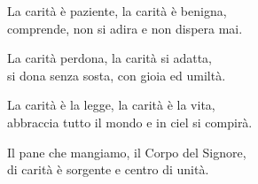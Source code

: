 

\spazio

\strofa La carità è paziente, la carità è benigna,\\
comprende, non si adira e non dispera mai.

\spazio


\spazio

\strofa La carità perdona, la carità si adatta,\\
si dona senza sosta, con gioia ed umiltà.

\spazio


\spazio

\strofa La carità è la legge, la carità è la vita,\\
abbraccia tutto il mondo e in ciel si compirà.

\spazio


\spazio

\strofa Il pane che mangiamo, il Corpo del Signore,\\
di carità è sorgente e centro di unità.

\spazio

